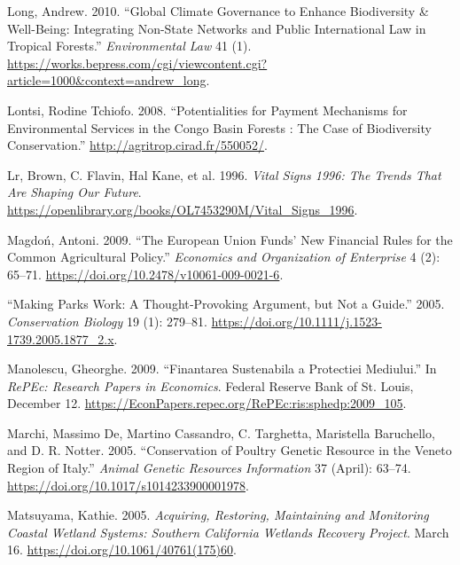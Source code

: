 \begin{CSLReferences}{1}{1}
Long, Andrew. 2010. {``Global Climate Governance to Enhance Biodiversity
\& Well-Being: Integrating Non-State Networks and Public International
Law in Tropical Forests.''} \emph{Environmental Law} 41 (1).
\url{https://works.bepress.com/cgi/viewcontent.cgi?article=1000&context=andrew_long}.

Lontsi, Rodine Tchiofo. 2008. {``Potentialities for Payment Mechanisms
for Environmental Services in the Congo Basin Forests : The Case of
Biodiversity Conservation.''} \url{http://agritrop.cirad.fr/550052/}.

Lr, Brown, C. Flavin, Hal Kane, et al. 1996. \emph{Vital Signs 1996: The
Trends That Are Shaping Our Future}.
\url{https://openlibrary.org/books/OL7453290M/Vital_Signs_1996}.

Magdoń, Antoni. 2009. {``The European Union Funds' New Financial Rules
for the Common Agricultural Policy.''} \emph{Economics and Organization
of Enterprise} 4 (2): 65--71.
\url{https://doi.org/10.2478/v10061-009-0021-6}.

{``Making Parks Work: A Thought‐Provoking Argument, but Not a Guide.''}
2005. \emph{Conservation Biology} 19 (1): 279--81.
\url{https://doi.org/10.1111/j.1523-1739.2005.1877_2.x}.

Manolescu, Gheorghe. 2009. {``Finantarea Sustenabila a Protectiei
Mediului.''} In \emph{RePEc: Research Papers in Economics}. Federal
Reserve Bank of St. Louis, December 12.
\url{https://EconPapers.repec.org/RePEc:ris:sphedp:2009_105}.

Marchi, Massimo De, Martino Cassandro, C. Targhetta, Maristella
Baruchello, and D. R. Notter. 2005. {``Conservation of Poultry Genetic
Resource in the Veneto Region of Italy.''} \emph{Animal Genetic
Resources Information} 37 (April): 63--74.
\url{https://doi.org/10.1017/s1014233900001978}.

Matsuyama, Kathie. 2005. \emph{Acquiring, Restoring, Maintaining and
Monitoring Coastal Wetland Systems: Southern California Wetlands
Recovery Project}. March 16. \url{https://doi.org/10.1061/40761(175)60}.


\end{CSLReferences}
